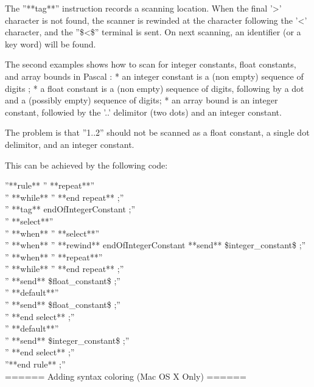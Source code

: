 {The ''**tag**'' instruction records a scanning location. When the final '>' character is not found, the scanner is rewinded at the character following the '<' character, and the ''\$<\$'' terminal is sent. On next scanning, an identifier (or a key word) will be found.

The second examples shows how to scan for integer constants, float constants, and array bounds in Pascal :
  * an integer constant is a (non empty) sequence of digits ;
  * a float constant is a (non empty) sequence of digits, following by a dot and a (possibly empty) sequence of digits;
  * an array bound is an integer constant, followied by the '..' delimitor (two dots) and an integer constant.

The problem is that ''1..2'' should not be scanned as a float constant, a single dot delimitor, and an integer constant.

This can be achieved by the following code:

''**rule** %
'' **repeat**''\\
'' **while** %
'' **end repeat** ;''\\
'' **tag** endOfIntegerConstant ;''\\
'' **select**''\\
'' **when** %
''  **select**''\\
''  **when** %
''   **rewind** endOfIntegerConstant **send** \$integer\_constant\$ ;''\\
''  **when** %
''   **repeat**''\\
''   **while** %
''   **end repeat** ;''\\
''   **send** \$float\_constant\$ ;''\\
''  **default**''\\
''   **send** \$float\_constant\$ ;''\\
''  **end select** ;''\\
'' **default**''\\
''  **send** \$integer\_constant\$ ;''\\
'' **end select** ;''\\
''**end rule** ;''\\


====== Adding syntax coloring (Mac OS X Only) ======

}
